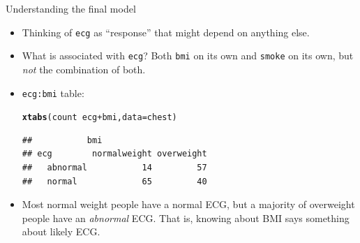 \documentclass[unknownkeysallowed]{beamer}\usepackage[]{graphicx}\usepackage[]{color}
\makeatletter
\newcommand{\hlopt}[1]{\textcolor[rgb]{0,0,0}{#1}}%
\newcommand{\hlstd}[1]{\textcolor[rgb]{0.345,0.345,0.345}{#1}}%
\newcommand{\hlkwc}[1]{\textcolor[rgb]{0.333,0.667,0.333}{#1}}%
\newcommand{\hlkwd}[1]{\textcolor[rgb]{0.737,0.353,0.396}{\textbf{#1}}}%
\newenvironment{kframe}{%
 \def\at@end@of@kframe{}%
 \ifinner\ifhmode%
  \def\at@end@of@kframe{\end{minipage}}%
  \begin{minipage}{\columnwidth}%
 \fi\fi%
 \def\FrameCommand##1{\hskip\@totalleftmargin \hskip-\fboxsep
 \colorbox{shadecolor}{##1}\hskip-\fboxsep
     \hskip-\linewidth \hskip-\@totalleftmargin \hskip\columnwidth}%
 \MakeFramed {\advance\hsize-\width
   \@totalleftmargin\z@ \linewidth\hsize
   \@setminipage}}%
 {\par\unskip\endMakeFramed%
 \at@end@of@kframe}
\newenvironment{knitrout}{}{} %
\makeatother
\begin{document}
\begin{frame}[fragile]{Understanding the final model}
  
  \begin{itemize}
  \item Thinking of \texttt{ecg} as ``response'' that might depend on
    anything else.
  \item What is associated with \texttt{ecg}? Both \texttt{bmi} on its
    own and \texttt{smoke} on its own, but \emph{not} the combination
    of both.
  \item \texttt{ecg:bmi} table:
\begin{knitrout}
\color{fgcolor}\begin{kframe}
\begin{alltt}
\hlkwd{xtabs}\hlstd{(count}\hlopt{~}\hlstd{ecg}\hlopt{+}\hlstd{bmi,}\hlkwc{data}\hlstd{=chest)}
\end{alltt}
\begin{verbatim}
##           bmi
## ecg        normalweight overweight
##   abnormal           14         57
##   normal             65         40
\end{verbatim}
\end{kframe}
\end{knitrout}

\item Most normal weight people have a normal ECG, but a
  majority of overweight people have an \emph{abnormal} ECG. That is,
  knowing about BMI says something about likely ECG.

  \end{itemize}
  
\end{frame}
\end{document}
